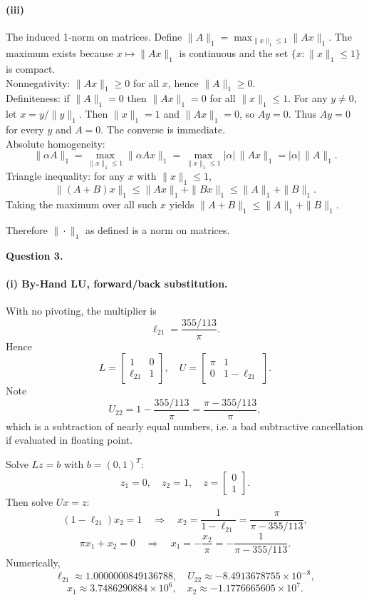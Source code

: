 \documentclass[11pt]{article}
\begin{document}
\paragraph{(iii)} The induced 1-norm on matrices.
Define \(\|A\|_1=\max_{\|x\|_1\le 1}\|Ax\|_1\). The maximum exists because \(x\mapsto \|Ax\|_1\) is continuous and the set \(\{x:\|x\|_1\le 1\}\) is compact.\\
Nonnegativity: \(\|Ax\|_1\ge 0\) for all \(x\), hence \(\|A\|_1\ge 0\).\\
Definiteness: if \(\|A\|_1=0\) then \(\|Ax\|_1=0\) for all \(\|x\|_1\le 1\). For any \(y\neq 0\), let \(x=y/\|y\|_1\). Then \(\|x\|_1=1\) and \(\|Ax\|_1=0\), so \(Ay=0\). Thus \(Ay=0\) for every \(y\) and \(A=0\). The converse is immediate.\\
Absolute homogeneity:
\[
\|\alpha A\|_1=\max_{\|x\|_1\le 1}\|\alpha Ax\|_1
=\max_{\|x\|_1\le 1} |\alpha|\,\|Ax\|_1
=|\alpha|\,\|A\|_1.
\]
Triangle inequality: for any \(x\) with \(\|x\|_1\le 1\),
\[
\|(A+B)x\|_1\le \|Ax\|_1+\|Bx\|_1\le \|A\|_1+\|B\|_1.
\]
Taking the maximum over all such \(x\) yields \(\|A+B\|_1\le \|A\|_1+\|B\|_1\).

Therefore \(\|\cdot\|_1\) as defined is a norm on matrices.


\newpage



{\bf Question 3.}


\paragraph{(i) By-Hand LU, forward/back substitution.}
With no pivoting, the multiplier is
\[
\ell_{21}=\frac{355/113}{\pi}.
\]
Hence
\[
L=\begin{bmatrix}1&0\\ \ell_{21}&1\end{bmatrix},
\quad
U=\begin{bmatrix}\pi&1\\ 0&1-\ell_{21}\end{bmatrix}.
\]
Note
\[
U_{22}=1-\frac{355/113}{\pi}=\frac{\pi-355/113}{\pi},
\]
which is a subtraction of nearly equal numbers, i.e. a bad subtractive cancellation if evaluated in floating point.

Solve \(Lz=b\) with \(b=(0,1)^T\):
\[
z_1=0,\quad z_2=1,
\quad z=\begin{bmatrix}0\\1\end{bmatrix}.
\]
Then solve \(Ux=z\):
\[
(1-\ell_{21})x_2=1
\quad\Rightarrow\quad
x_2=\frac{1}{1-\ell_{21}}=\frac{\pi}{\pi-355/113},
\]
\[
\pi x_1+x_2=0
\quad\Rightarrow\quad
x_1=-\frac{x_2}{\pi}=-\frac{1}{\pi-355/113}.
\]
Numerically,
\[
\ell_{21}\approx1.0000000849136788,\quad
U_{22}\approx-8.4913678755\times10^{-8},
\]
\[
x_1\approx3.7486290884\times10^{6},\quad
x_2\approx-1.1776665605\times10^{7}.
\]
\end{document}
